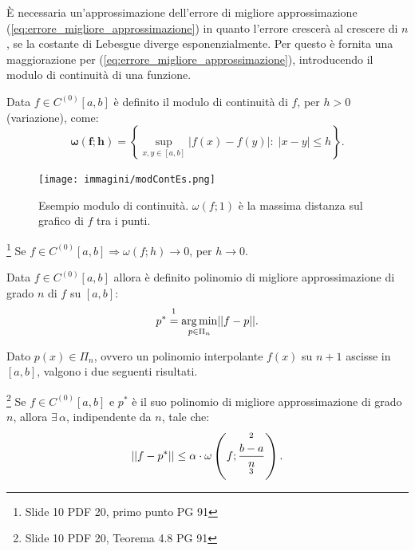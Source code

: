 È necessaria un'approssimazione dell'errore di migliore approssimazione (\ref{eq:errore_migliore_approssimazione}) in quanto l'errore crescerà al crescere di $n$, se la costante di Lebesgue diverge esponenzialmente. Per questo è fornita una maggiorazione per (\ref{eq:errore_migliore_approssimazione}), introducendo il modulo di continuità di una funzione.

\begin{definition}
    Data $f\in C^{(0)}[a,b]$ è definito il modulo di continuità di $f$, per $h>0$ (variazione), come:
    \begin{equation}\label{eq:modCont}
        \boldsymbol{\omega(f;h)}=\left\{\underset{x,y\in [a,b]}{\sup}|f(x)-f(y)|:\; |x-y|\leq h\right\}.
    \end{equation}
\end{definition}

\begin{figure}
    \centering
    \texttt{[image: immagini/modContEs.png]}
    \caption{Esempio modulo di continuità. $\omega (f;1)$ è la massima distanza sul grafico di $f$ tra i punti.}\label{fig:modContEs}
\end{figure}

\begin{theorem}\label{th:modContInf}\footnote{Slide 10 PDF 20, primo punto PG 91}
    Se $f\in C^{(0)}[a,b]\Rightarrow\omega (f;h)\rightarrow 0$, per $h\rightarrow 0$.
\end{theorem}

\begin{definition}
    Data $f\in C^{(0)}[a,b]$ allora è definito polinomio di migliore approssimazione di grado $n$ di $f$ su $[a,b]$:
    \begin{equation}
        p^* \overset{\footnotemark}{=} \underset{p\in\Pi_n}{\arg\min}||f-p||.
    \end{equation}
\end{definition}


Dato $p(x)\in\Pi_n$, ovvero un polinomio interpolante $f(x)$ su $n+1$ ascisse in $[a,b]$, valgono i due seguenti risultati.

\begin{theorem}[Jackson]\label{th:Jackson}\footnote{Slide 10 PDF 20, Teorema 4.8 PG 91}
    Se $f\in C^{(0)}[a,b]$ e $p^*$ è il suo polinomio di migliore approssimazione di grado $n$, allora $\exists\, \alpha$, indipendente da $n$, tale che:
    \begin{equation}\label{eq:approssimazione_jackson}
        ||f-p^*||\leq \alpha\cdot\omega\left(f;\frac{\overset{\footnotemark}{b-a}}{\underset{\footnotemark}{n}}\right).
    \end{equation}
\end{theorem}

